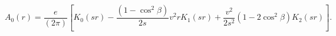 \begin{equation}
A_{0}(r)=\frac{e}{(2\pi)}\left[  K_{0}(sr)-\frac{\left(  1-\cos^{2}%
\beta\right)  }{2s}v^{2}rK_{1}(sr)+\frac{v^{2}}{2s^{2}}\left(  1-2\cos
^{2}\beta\right)  K_{2}(sr)\right]  . \label{Abeta}%
\end{equation}

